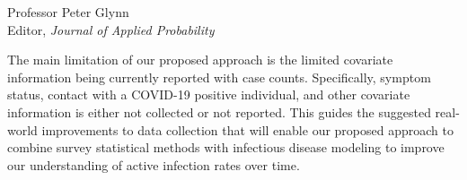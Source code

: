 \documentclass[11pt]{letter} %
\begin{document}
\begin{letter}{Professor
	Peter Glynn\\
	Editor, {\em Journal of Applied Probability}}
\begin{itemize}
The main limitation of our proposed approach is the limited covariate information being currently reported with case counts.  Specifically, symptom status, contact with a COVID-19 positive individual, and other covariate information is either not collected or not reported.  This guides the suggested real-world improvements to data collection that will enable our proposed approach to combine survey statistical methods with infectious disease modeling to improve our understanding of active infection rates over time.
\vspace{5mm}

\end{itemize}

\end{letter}
\end{document}

